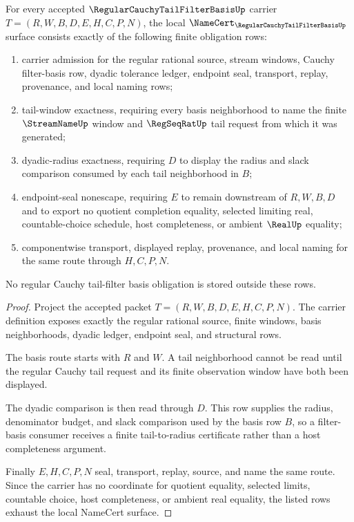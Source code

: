\begin{theorem}
\label{thm:regular-cauchy-tail-filter-basis-namecert-obligations}
For every accepted $\RegularCauchyTailFilterBasisUp$ carrier $T=(R,W,B,D,E,H,C,P,N)$, the local $\NameCert_{\RegularCauchyTailFilterBasisUp}$ surface consists exactly of the following finite obligation rows:
\begin{enumerate}
\item carrier admission for the regular rational source, stream windows, Cauchy filter-basis row, dyadic tolerance ledger, endpoint seal, transport, replay, provenance, and local naming rows;
\item tail-window exactness, requiring every basis neighborhood to name the finite $\StreamNameUp$ window and $\RegSeqRatUp$ tail request from which it was generated;
\item dyadic-radius exactness, requiring $D$ to display the radius and slack comparison consumed by each tail neighborhood in $B$;
\item endpoint-seal nonescape, requiring $E$ to remain downstream of $R,W,B,D$ and to export no quotient completion equality, selected limiting real, countable-choice schedule, host completeness, or ambient $\RealUp$ equality;
\item componentwise transport, displayed replay, provenance, and local naming for the same route through $H,C,P,N$.
\end{enumerate}
No regular Cauchy tail-filter basis obligation is stored outside these rows.
\end{theorem}
\begin{proof}
Project the accepted packet $T=(R,W,B,D,E,H,C,P,N)$. The carrier definition exposes exactly the regular rational source, finite windows, basis neighborhoods, dyadic ledger, endpoint seal, and structural rows.

The basis route starts with $R$ and $W$. A tail neighborhood cannot be read until the regular Cauchy tail request and its finite observation window have both been displayed.

The dyadic comparison is then read through $D$. This row supplies the radius, denominator budget, and slack comparison used by the basis row $B$, so a filter-basis consumer receives a finite tail-to-radius certificate rather than a host completeness argument.

Finally $E,H,C,P,N$ seal, transport, replay, source, and name the same route. Since the carrier has no coordinate for quotient equality, selected limits, countable choice, host completeness, or ambient real equality, the listed rows exhaust the local NameCert surface.
\end{proof}

